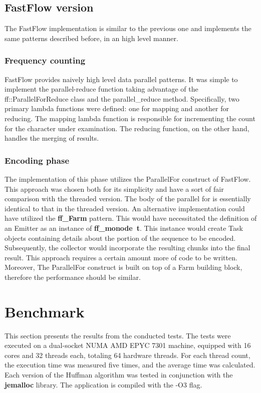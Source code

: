 \documentclass{article}
\begin{document}
\subsection{FastFlow version}
The FastFlow implementation is similar to the previous one and
implements the same patterns described before, in an high level manner.
\subsubsection{Frequency counting}
FastFlow provides naively high level data parallel patterns. It was simple
to implement the parallel-reduce function taking advantage of the ff::ParallelForReduce
class and the parallel\_reduce method.
Specifically, two primary lambda functions were defined: one for mapping and another for reducing.
The mapping lambda function is responsible for incrementing the count for the character under examination.
The reducing function, on the other hand, handles the merging of results.
\subsubsection{Encoding phase}
The implementation of this phase utilizes the ParallelFor construct of FastFlow.
This approach was chosen both for its simplicity and have a sort of fair comparison
with the threaded version. The body of the parallel for is essentially identical
to that in the threaded version.
An alternative implementation could have utilized the \textbf{ff\_Farm} pattern.
This would have necessitated the definition of an Emitter as an instance of \textbf{ff\_monode\ t}.
This instance would create Task objects containing details about the portion of the sequence to be
encoded. Subsequently, the collector would incorporate the resulting chunks into the final result.
This approach requires a certain amount more of code to be written. Moreover, The ParallelFor
construct is built on top of a Farm building block, therefore the performance should be similar.

\section{Benchmark}
This section presents the results from the conducted tests. The tests were executed on a dual-socket NUMA
AMD EPYC 7301 machine, equipped with 16 cores and 32 threads each, totaling 64 hardware threads.
For each thread count, the execution time was measured five times, and the average time was calculated.
Each version of the Huffman algorithm was tested in conjunction with the \textbf{jemalloc} library.
The application is compiled with the -O3 flag.
\end{document}
